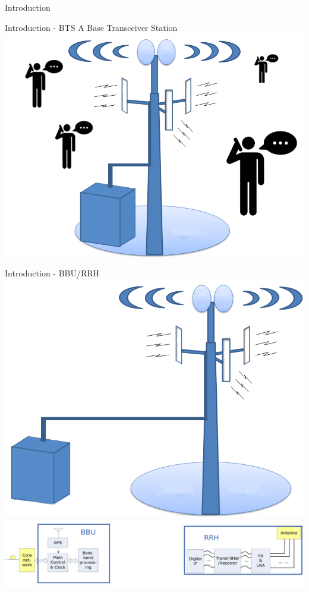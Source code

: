 \documentclass[10 pt]{beamer}
\begin{document}
\begin{section}{Introduction}

\begin{frame}{Introduction - BTS}
  \centering
    A Base Transceiver Station
  \includegraphics[scale=0.3]{btsppl.png}

\end{frame}


\begin{frame}{Introduction - BBU/RRH}
  \centering
  \includegraphics[scale=0.2]{cloudbts.png}\\
  \includegraphics[scale=0.175]{BBURRH.png}
\end{frame}




\end{section}
\end{document}
